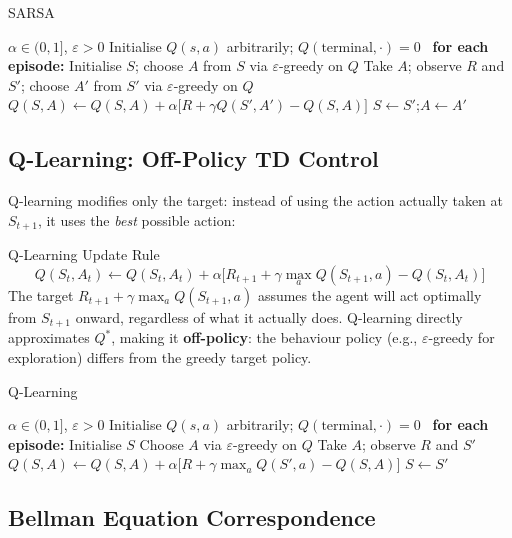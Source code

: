 \documentclass[11pt,a4paper]{article}
\begin{document}
\begin{algobox}[breakable]{SARSA}
\begin{algorithmic}[1]
\Require $\alpha\in(0,1]$, $\varepsilon>0$
\State Initialise $Q(s,a)$ arbitrarily; $Q(\text{terminal},\cdot)=0$
\Loop\ \textbf{for each episode:}
  \State Initialise $S$; choose $A$ from $S$ via $\varepsilon$-greedy on $Q$
  \Repeat
    \State Take $A$; observe $R$ and $S'$; choose $A'$ from $S'$ via $\varepsilon$-greedy on $Q$
    \State $Q(S,A)\leftarrow Q(S,A)+\alpha\bigl[R+\gamma Q(S',A')-Q(S,A)\bigr]$
    \State $S\leftarrow S'$;\quad $A\leftarrow A'$
\EndLoop
\end{algorithmic}
\end{algobox}

\subsection{Q-Learning: Off-Policy TD Control}

Q-learning modifies only the target: instead of using the action actually taken at $S_{t+1}$, it uses the \emph{best} possible action:

\begin{defbox}{Q-Learning Update Rule}
\[
Q(S_t,A_t) \leftarrow Q(S_t,A_t) + \alpha\bigl[R_{t+1} + \gamma\max_a Q(S_{t+1},a) - Q(S_t,A_t)\bigr]
\]
The target $R_{t+1}+\gamma\max_a Q(S_{t+1},a)$ assumes the agent will act optimally from $S_{t+1}$ onward, regardless of what it actually does. Q-learning directly approximates $Q^*$, making it \textbf{off-policy}: the behaviour policy (e.g., $\varepsilon$-greedy for exploration) differs from the greedy target policy.
\end{defbox}

\begin{algobox}[breakable]{Q-Learning}
\begin{algorithmic}[1]
\Require $\alpha\in(0,1]$, $\varepsilon>0$
\State Initialise $Q(s,a)$ arbitrarily; $Q(\text{terminal},\cdot)=0$
\Loop\ \textbf{for each episode:}
  \State Initialise $S$
  \Repeat
    \State Choose $A$ via $\varepsilon$-greedy on $Q$ 
    \State Take $A$; observe $R$ and $S'$
    \State $Q(S,A)\leftarrow Q(S,A)+\alpha\bigl[R+\gamma\max_a Q(S',a)-Q(S,A)\bigr]$
    \State $S\leftarrow S'$
\EndLoop
\end{algorithmic}
\end{algobox}

\subsection{Bellman Equation Correspondence}
\end{document}
